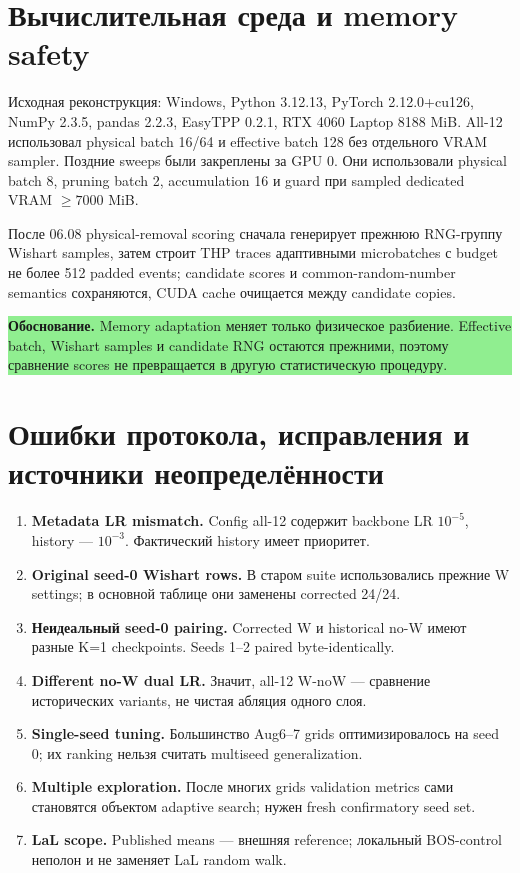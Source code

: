 \documentclass[11pt,a4paper]{article}
\newcommand{\boxnote}[2]{%
  \begin{center}\setlength{\fboxsep}{9pt}%
  \colorbox{#1}{\begin{minipage}{0.94\textwidth}\raggedright #2\par\end{minipage}}
  \end{center}}
\newcommand{\rationale}[1]{\boxnote{lightgreen}{\textbf{Обоснование.} #1}}
\begin{document}
\section{Вычислительная среда и memory safety}

Исходная реконструкция: Windows, Python 3.12.13, PyTorch 2.12.0+cu126,
NumPy 2.3.5, pandas 2.2.3, EasyTPP 0.2.1, RTX 4060 Laptop 8188 MiB.
All-12 использовал physical batch 16/64 и effective batch 128 без отдельного
VRAM sampler. Поздние sweeps были закреплены за GPU 0. Они использовали physical
batch 8, pruning batch 2, accumulation 16 и guard при sampled dedicated VRAM
$\ge7000$ MiB.

После 06.08 physical-removal scoring сначала генерирует прежнюю RNG-группу
Wishart samples, затем строит THP traces адаптивными microbatches с budget не
более 512 padded events; candidate scores и common-random-number semantics
сохраняются, CUDA cache очищается между candidate copies.

\rationale{Memory adaptation меняет только физическое разбиение. Effective
batch, Wishart samples и candidate RNG остаются прежними, поэтому сравнение
scores не превращается в другую статистическую процедуру.}

\section{Ошибки протокола, исправления и источники неопределённости}

\begin{enumerate}
  \item \textbf{Metadata LR mismatch.} Config all-12 содержит backbone LR
  $10^{-5}$, history --- $10^{-3}$. Фактический history имеет приоритет.
  \item \textbf{Original seed-0 Wishart rows.} В старом suite использовались
  прежние W settings; в основной таблице они заменены corrected 24/24.
  \item \textbf{Неидеальный seed-0 pairing.} Corrected W и historical no-W
  имеют разные K=1 checkpoints. Seeds 1--2 paired byte-identically.
  \item \textbf{Different no-W dual LR.} Значит, all-12 W-noW --- сравнение
  исторических variants, не чистая абляция одного слоя.
  \item \textbf{Single-seed tuning.} Большинство Aug6--7 grids оптимизировалось
  на seed 0; их ranking нельзя считать multiseed generalization.
  \item \textbf{Multiple exploration.} После многих grids validation metrics
  сами становятся объектом adaptive search; нужен fresh confirmatory seed set.
  \item \textbf{LaL scope.} Published means --- внешняя reference; локальный
  BOS-control неполон и не заменяет LaL random walk.
\end{enumerate}
\end{document}
